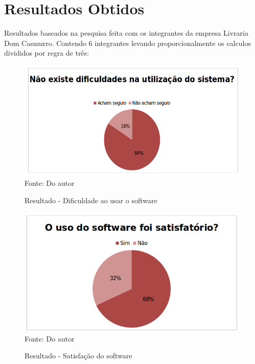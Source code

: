 \chapter{Resultados Obtidos}

Resultados baseados na pesquisa feita com os integrantes da empresa Livraria Dom Casmurro.
Contendo 6 integrantes levando proporcionalmente os calculos divididos  por regra de três:


\begin{figure}[H]
	\centering 
	\caption{Resultado - Dificuldade ao usar o software}
	\label{resultado-dif}
	\includegraphics[scale = 0.6]{imagens/resultado-dificuldade.png}
	\\Fonte: Do autor
\end{figure}

\begin{figure}[H]
	\centering 
	\caption{Resultado - Satisfação do software}
	\label{resultado-satis}
	\includegraphics[scale = 0.6]{imagens/resultado-satis.png}
	\\Fonte: Do autor
\end{figure}

